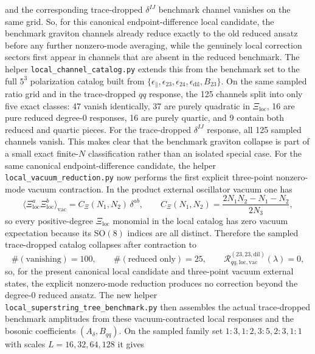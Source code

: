 \documentclass[11pt]{article}
\begin{document}
and the corresponding trace-dropped $\delta^{IJ}$ benchmark channel vanishes on the same grid. So, for this canonical endpoint-difference local candidate, the benchmark graviton channels already reduce exactly to the old reduced ansatz before any further nonzero-mode averaging, while the genuinely local correction sectors first appear in channels that are absent in the reduced benchmark. The helper \texttt{local\_channel\_catalog.py} extends this from the benchmark set to the full $5^3$ polarization catalog built from $\{\epsilon_\parallel,\epsilon_{23},\epsilon_{24},\epsilon_{\mathrm{dil}},B_{23}\}$. On the same sampled ratio grid and in the trace-dropped $qq$ response, the 125 channels split into only five exact classes: 47 vanish identically, 37 are purely quadratic in $\Xi_{\mathrm{loc}}$, 16 are pure reduced degree-$0$ responses, 16 are purely quartic, and 9 contain both reduced and quartic pieces. For the trace-dropped $\delta^{IJ}$ response, all 125 sampled channels vanish. This makes clear that the benchmark graviton collapse is part of a small exact finite-$N$ classification rather than an isolated special case.
For the same canonical endpoint-difference candidate, the helper \texttt{local\_vacuum\_reduction.py} now performs the first explicit three-point nonzero-mode vacuum contraction. In the product external oscillator vacuum one has
\begin{equation}
\bigl\langle \Xi_{\mathrm{loc}}^a \Xi_{\mathrm{loc}}^b \bigr\rangle_{\mathrm{vac}}
=
C_\Xi(N_1,N_2)\,\delta^{ab},
\qquad
C_\Xi(N_1,N_2)
=
\frac{2N_1N_2-N_1-N_2}{2N_3},
\label{eq:theta-local-vacuum-two-point}
\end{equation}
so every positive-degree $\Xi_{\mathrm{loc}}$ monomial in the local catalog has zero vacuum expectation because its SO$(8)$ indices are all distinct. Therefore the sampled trace-dropped catalog collapses after contraction to
\begin{equation}
\#(\text{vanishing})=100,
\qquad
\#(\text{reduced only})=25,
\qquad
\mathcal{R}^{(23,23,\mathrm{dil})}_{qq,\mathrm{loc,vac}}(\lambda)=0,
\label{eq:theta-local-vacuum-collapse}
\end{equation}
so, for the present canonical local candidate and three-point vacuum external states, the explicit nonzero-mode reduction produces no correction beyond the degree-$0$ reduced ansatz.
The new helper \texttt{local\_superstring\_tree\_benchmark.py} then assembles the actual trace-dropped benchmark amplitudes from these vacuum-contracted local responses and the bosonic coefficients $(A_\delta,B_{qq})$. On the sampled family set $1{:}3,1{:}2,3{:}5,2{:}3,1{:}1$ with scales $L=16,32,64,128$ it gives
\end{document}
